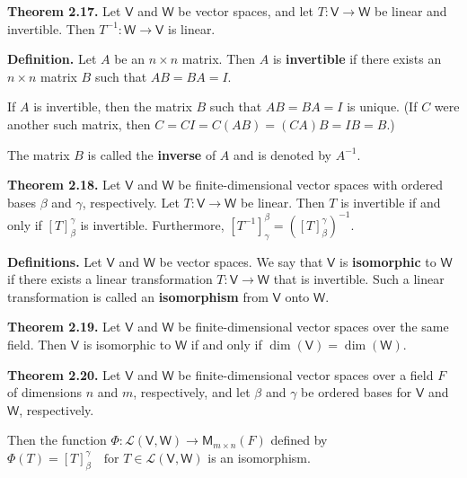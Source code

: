 \documentclass{article}
\newcommand{\0}{\mathit{0}}
\begin{document}
\medskip

\textbf{Theorem 2.17.} Let $\mathsf{V}$ and $\mathsf{W}$ be vector spaces, and let
$T: \mathsf{V} \to \mathsf{W}$ be linear and invertible.
Then $T^{-1}: \mathsf{W} \to \mathsf{V}$ is linear.

\medskip

\textbf{Definition.}  
Let $A$ be an $n \times n$ matrix. Then $A$ is \textbf{invertible} if there exists an  
$n \times n$ matrix $B$ such that $AB = BA = I$.  

If $A$ is invertible, then the matrix $B$ such that $AB = BA = I$ is unique.  
(If $C$ were another such matrix, then  
$C = CI = C(AB) = (CA)B = IB = B$.)  

The matrix $B$ is called the \textbf{inverse} of $A$ and is denoted by $A^{-1}$.

\medskip

\textbf{Theorem 2.18.} Let $\mathsf{V}$ and $\mathsf{W}$ be finite-dimensional vector spaces
with ordered bases $\beta$ and $\gamma$, respectively. Let
$T: \mathsf{V} \to \mathsf{W}$ be linear.
Then $T$ is invertible if and only if $\left[ T \right]^\gamma_\beta$ is invertible.
Furthermore,
\(
\left[ T^{-1} \right]^\beta_\gamma = \left( \left[ T \right]^\gamma_\beta \right)^{-1}.
\)

\medskip

\textbf{Definitions.} Let $\mathsf{V}$ and $\mathsf{W}$ be vector spaces.
We say that $\mathsf{V}$ is \textbf{isomorphic} to $\mathsf{W}$ if there exists a linear transformation
$T: \mathsf{V} \to \mathsf{W}$ that is invertible. Such a linear transformation is called an
\textbf{isomorphism} from $\mathsf{V}$ onto $\mathsf{W}$.

\medskip

\textbf{Theorem 2.19.} Let $\mathsf{V}$ and $\mathsf{W}$ be finite-dimensional vector spaces
over the same field. Then $\mathsf{V}$ is isomorphic to $\mathsf{W}$ if and only if
\(
\dim(\mathsf{V}) = \dim(\mathsf{W}).
\)

\medskip

\textbf{Theorem 2.20.} Let $\mathsf{V}$ and $\mathsf{W}$ be finite-dimensional vector spaces
over a field $F$ of dimensions $n$ and $m$, respectively, and let $\beta$ and $\gamma$
be ordered bases for $\mathsf{V}$ and $\mathsf{W}$, respectively.

Then the function
\(
\Phi: \mathcal{L}(\mathsf{V}, \mathsf{W}) \to \mathsf{M}_{m \times n}(F)
\)
defined by
\(
\Phi(T) = \left[ T \right]^\gamma_\beta \quad \text{for } T \in \mathcal{L}(\mathsf{V}, \mathsf{W})
\)
is an isomorphism.
\end{document}
